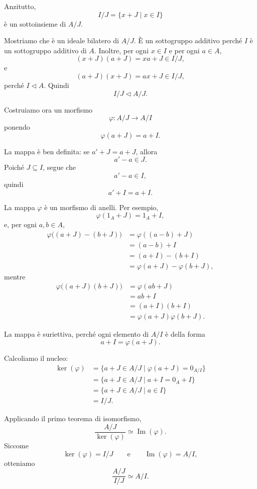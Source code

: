 \documentclass[a4paper]{article}
\begin{document}
\begin{radioactive}
\begin{snippetproof}{}
    Anzitutto,
    \[
        I/J=\{x+J\mid x\in I\}
    \]
    è un sottoinsieme di \(A/J\).

    Mostriamo che è un ideale bilatero di \(A/J\). È un sottogruppo additivo perché \(I\) è un sottogruppo additivo di \(A\). Inoltre, per ogni \(x\in I\) e per ogni \(a\in A\),
    \[
        (x+J)(a+J)=xa+J\in I/J,
    \]
    e
    \[
        (a+J)(x+J)=ax+J\in I/J,
    \]
    perché \(I\triangleleft A\). Quindi
    \[
        I/J\triangleleft A/J.
    \]

    Costruiamo ora un morfismo
    \[
        \varphi\colon A/J\to A/I
    \]
    ponendo
    \[
        \varphi(a+J)=a+I.
    \]

    La mappa è ben definita: se \(a'+J=a+J\), allora
    \[
        a'-a\in J.
    \]
    Poiché \(J\subseteq I\), segue che
    \[
        a'-a\in I,
    \]
    quindi
    \[
        a'+I=a+I.
    \]

    La mappa \(\varphi\) è un morfismo di anelli. Per esempio,
    \[
        \varphi(1_A+J)=1_A+I,
    \]
    e, per ogni \(a,b\in A\),
    \begin{align*}
        \varphi\big((a+J)-(b+J)\big)
        &=
        \varphi((a-b)+J) \\
        &=
        (a-b)+I \\
        &=
        (a+I)-(b+I) \\
        &=
        \varphi(a+J)-\varphi(b+J),
    \end{align*}
    mentre
    \begin{align*}
        \varphi\big((a+J)(b+J)\big)
        &=
        \varphi(ab+J) \\
        &=
        ab+I \\
        &=
        (a+I)(b+I) \\
        &=
        \varphi(a+J)\varphi(b+J).
    \end{align*}

    La mappa è suriettiva, perché ogni elemento di \(A/I\) è della forma
    \[
        a+I=\varphi(a+J).
    \]

    Calcoliamo il nucleo:
    \begin{align*}
        \ker(\varphi)
        &=
        \{a+J\in A/J\mid \varphi(a+J)=0_{A/I}\} \\
        &=
        \{a+J\in A/J\mid a+I=0_A+I\} \\
        &=
        \{a+J\in A/J\mid a\in I\} \\
        &=
        I/J.
    \end{align*}

    Applicando il primo teorema di isomorfismo,
    \[
        \frac{A/J}{\ker(\varphi)}
        \simeq
        \operatorname{Im}(\varphi).
    \]
    Siccome
    \[
        \ker(\varphi)=I/J
        \qquad
        \text{e}
        \qquad
        \operatorname{Im}(\varphi)=A/I,
    \]
    otteniamo
    \[
        \frac{A/J}{I/J}
        \simeq
        A/I.
    \]
\end{snippetproof}
\end{radioactive}
\end{document}
